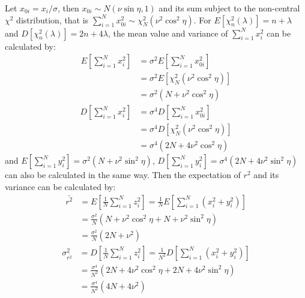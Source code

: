 Let $x_{0i}=x_i/\sigma$, then $x_{0i} \sim N(\nu \sin \eta,1)$ and its sum subject to the non-central $\chi^2$ distribution, that is $\sum_{i=1}^{N}x_{0i}^2 \sim \chi_N^2(\nu^2\cos^2\eta)$. For $E[\chi_n^2(\lambda)]=n+\lambda$ and $D[\chi_n^2(\lambda)]=2n+4\lambda$, the mean value and variance of $\sum_{i=1}^{N}x_i^2$ can be calculated by:
\begin{equation}
\begin{split}
    E\left[\sum_{i=1}^{N}x_i^2\right]&=\sigma^2E\left[\sum_{i=1}^{N}x_{0i}^2\right]\\
    &=\sigma^2E\left[\chi_N^2(\nu^2\cos^2\eta)\right]\\
    &=\sigma^2\left(N+\nu^2\cos^2\eta\right)
\end{split}
\label{app:E_x}
\end{equation}
\begin{equation}
\begin{split}
    D\left[\sum_{i=1}^{N}x_i^2\right]&=\sigma^4D\left[\sum_{i=1}^{N}x_{0i}^2\right]\\
    &=\sigma^4D\left[\chi_N^2(\nu^2\cos^2\eta)\right]\\
    &=\sigma^4\left(2N+4\nu^2\cos^2\eta\right)
\label{app:D_x}
\end{split}
\end{equation}
and $E[\sum_{i=1}^{N}y_i^2]=\sigma^2(N+\nu^2\sin^2\eta)$, $D[\sum_{i=1}^{N}y_i^2]=\sigma^4(2N+4\nu^2\sin^2\eta)$ can also be calculated in the same way. Then the expectation of $r^2$ and its variance can be calculated by:
\begin{equation}
\begin{split}
    \bar{r^2}&=E\left[\frac{1}{N}\sum_{i=1}^{N}z_i^2\right]=\frac{1}{N}E\left[\sum_{i=1}^{N}(x_i^2+y_i^2)\right]\\
    &=\frac{\sigma^2}{N}\left(N+\nu^2\cos^2\eta+N+\nu^2\sin^2\eta\right)\\
    &=\frac{\sigma^2}{N}\left(2N+\nu^2\right)
\end{split}
\label{app:E_r2}
\end{equation}
\begin{equation}
\begin{split}
    \sigma_{\bar{r^2}}^2&=D\left[\frac{1}{N}\sum_{i=1}^{N}z_i^2\right]=\frac{1}{N^2}D\left[\sum_{i=1}^{N}\left(x_i^2+y_i^2\right)\right]\\
    &=\frac{\sigma^4}{N^2}\left(2N+4\nu^2\cos^2\eta+2N+4\nu^2\sin^2\eta\right)\\
    &=\frac{\sigma^4}{N^2}\left(4N+4\nu^2\right)
\end{split}
\label{app:D_r2}
\end{equation}

